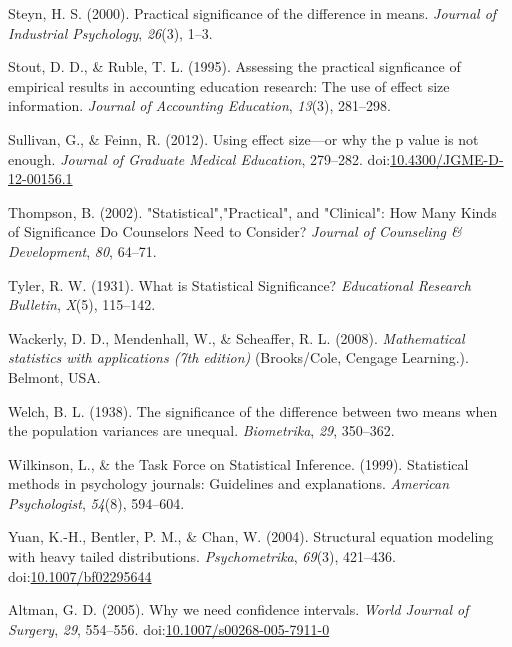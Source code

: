 \documentclass[
  man,floatsintext]{apa6}
\begin{document}
\leavevmode\hypertarget{ref-Steyn_2000}{}%
Steyn, H. S. (2000). Practical significance of the difference in means. \emph{Journal of Industrial Psychology}, \emph{26}(3), 1--3.

\leavevmode\hypertarget{ref-Stout_Ruble_1995}{}%
Stout, D. D., \& Ruble, T. L. (1995). Assessing the practical signficance of empirical results in accounting education research: The use of effect size information. \emph{Journal of Accounting Education}, \emph{13}(3), 281--298.

\leavevmode\hypertarget{ref-Sullivan_Feinn_2012}{}%
Sullivan, G., \& Feinn, R. (2012). Using effect size---or why the p value is not enough. \emph{Journal of Graduate Medical Education}, 279--282. doi:\href{https://doi.org/10.4300/JGME-D-12-00156.1}{10.4300/JGME-D-12-00156.1}

\leavevmode\hypertarget{ref-Thompson_2002}{}%
Thompson, B. (2002). "Statistical","Practical", and "Clinical": How Many Kinds of Significance Do Counselors Need to Consider? \emph{Journal of Counseling \& Development}, \emph{80}, 64--71.

\leavevmode\hypertarget{ref-Tyler_1931}{}%
Tyler, R. W. (1931). What is Statistical Significance? \emph{Educational Research Bulletin}, \emph{X}(5), 115--142.

\leavevmode\hypertarget{ref-Wackerly_et_al_2008}{}%
Wackerly, D. D., Mendenhall, W., \& Scheaffer, R. L. (2008). \emph{Mathematical statistics with applications (7th edition)} (Brooks/Cole, Cengage Learning.). Belmont, USA.

\leavevmode\hypertarget{ref-Welch_1938}{}%
Welch, B. L. (1938). The significance of the difference between two means when the population variances are unequal. \emph{Biometrika}, \emph{29}, 350--362.

\leavevmode\hypertarget{ref-Wilkinson_1999}{}%
Wilkinson, L., \& the Task Force on Statistical Inference. (1999). Statistical methods in psychology journals: Guidelines and explanations. \emph{American Psychologist}, \emph{54}(8), 594--604.

\leavevmode\hypertarget{ref-Yuan_et_al_2004}{}%
Yuan, K.-H., Bentler, P. M., \& Chan, W. (2004). Structural equation modeling with heavy tailed distributions. \emph{Psychometrika}, \emph{69}(3), 421--436. doi:\href{https://doi.org/10.1007/bf02295644}{10.1007/bf02295644}

\leavevmode\hypertarget{ref-Altman_2005}{}%
Altman, G. D. (2005). Why we need confidence intervals. \emph{World Journal of Surgery}, \emph{29}, 554--556. doi:\href{https://doi.org/10.1007/s00268-005-7911-0}{10.1007/s00268-005-7911-0}
\end{document}
